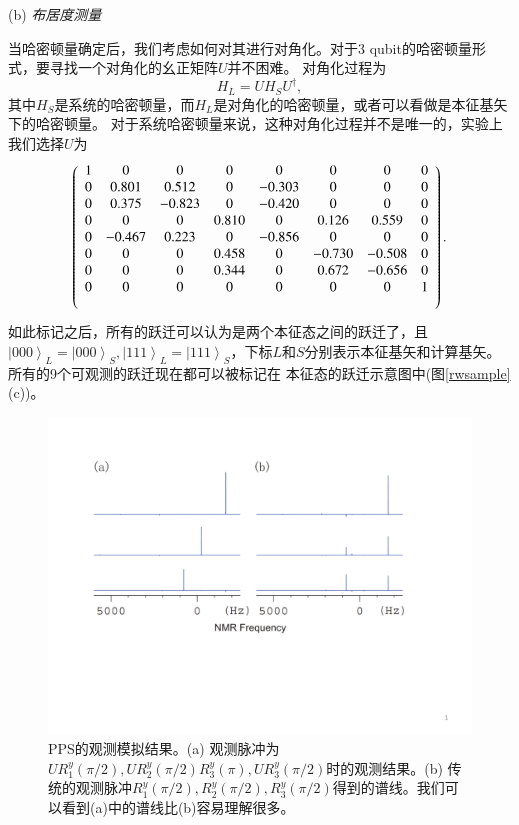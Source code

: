 (b) \emph{布居度测量}

当哈密顿量确定后，我们考虑如何对其进行对角化。对于3 qubit的哈密顿量形式，要寻找一个对角化的幺正矩阵$U$并不困难。 对角化过程为
\begin{equation} \label{diag}
H_L = UH_SU^{\dag},
\end{equation}
其中$H_S$是系统的哈密顿量，而$H_L$是对角化的哈密顿量，或者可以看做是本征基矢下的哈密顿量。
对于系统哈密顿量来说，这种对角化过程并不是唯一的，实验上我们选择$U$为
\begin{eqnarray}\label{Transformation}
\left( {\begin{array}{*{20}c}
   {1} & {0} & {0} & {0} & {0} & {0} & {0} & {0}  \\
   {0} & {0.801} & {0.512} & {0} & {-0.303} & {0} & {0} & {0}  \\
   {0} & {0.375} & {-0.823} & {0} & {-0.420} & {0} & {0} & {0}  \\
   {0} & {0} & {0} & {0.810} & {0} & {0.126} & {0.559} & {0}  \\
   {0} & {-0.467} & {0.223} & {0} & {-0.856} & {0} & {0} & {0}  \\
   {0} & {0} & {0} & {0.458} & {0} & {-0.730} & {-0.508} & {0}  \\
   {0} & {0} & {0} & {0.344} & {0} & {0.672} & {-0.656} & {0}  \\
   {0} & {0} & {0} & {0} & {0} & {0} & {0} & {1}  \\ \nonumber
\end{array}} \right).
\end{eqnarray}
如此标记之后，所有的跃迁可以认为是两个本征态之间的跃迁了，且$\left\vert 000
\right\rangle_L=\left\vert 000 \right\rangle_S,\left\vert 111
\right\rangle_L=\left\vert 111 \right\rangle_S$，下标$L$和$S$分别表示本征基矢和计算基矢。所有的9个可观测的跃迁现在都可以被标记在
本征态的跃迁示意图中(图\ref{rwsample}(c))。

\begin{figure}[htbp]
            \begin{center}
              \includegraphics[width= 0.8\columnwidth]{figures/rwpps.pdf}
              \caption{PPS的观测模拟结果。(a) 观测脉冲为$UR_1^y(\pi/2),UR_2^y(\pi/2)R_3^y(\pi),UR_3^y(\pi/2)$时的观测结果。(b) 传统的观测脉冲$R_1^y(\pi/2),R_2^y(\pi/2),R_3^y(\pi/2)$得到的谱线。我们可以看到(a)中的谱线比(b)容易理解很多。}
              \label{rwpps}
            \end{center}
 \end{figure}

